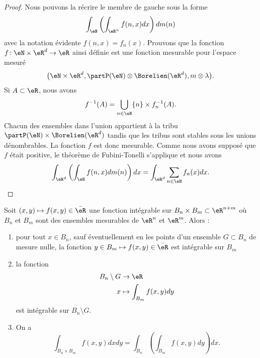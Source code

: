 \begin{proof}
	Nous pouvons la récrire le membre de gauche sous la forme
	\begin{equation}
		\int_{\eN}\left( \int_{\eR^n}f(n,x)dx \right)dm(n)
	\end{equation}
	avec la notation évidente \( f(n,x)=f_n(x)\). Prouvons que la fonction \( f\colon \eN\times\eR^d\to \eR\) ainsi définie est une fonction mesurable pour l'espace mesuré
	\begin{equation}
		\big( \eN\times\eR^d,\partP(\eN)\otimes\Borelien(\eR^d),m\otimes\lambda \big).
	\end{equation}
	Si \( A\subset\eR\), nous avons
	\begin{equation}
		f^{-1}(A)=\bigcup_{n\in\eN}\{ n \}\times f_n^{-1}(A).
	\end{equation}
	Chacun des ensembles dans l'union appartient à la tribu \( \partP(\eN)\times\Borelien(\eR^d)\) tandis que les tribus sont stables sous les unions dénombrables. La fonction \( f\) est donc mesurable. Comme nous avons supposé que \( f\) était positive, le théorème de Fubini-Tonelli s'applique et nous avons
	\begin{equation}
		\int_{\eR^d}\left( \int_{\eN}f(n,x)dm(n) \right)dx=\int_{\eR^d}\sum_{n\in \eN}f_n(x)dx.
	\end{equation}
\end{proof}

\begin{theorem}[Fubini]\label{ThoFubini}
	Soit \( (x,y)\mapsto f(x,y)\in\bar \eR\) une fonction intégrable sur \( B_n\times B_m\subset\eR^{n+m}\) où \( B_n\) et \( B_m\) sont des ensembles mesurables de \( \eR^n\) et \( \eR^m\). Alors :
	\begin{enumerate}
		\item pour tout \( x\in B_n\), sauf éventuellement en les points d'un ensemble \( G\subset B_n\) de mesure nulle, la fonction \( y\in B_m\mapsto f(x,y)\in\bar\eR\) est intégrable sur \( B_m\)
		\item
		      la fonction
		      \begin{equation}
			      \begin{aligned}
				      B_n\setminus G & \to \eR                    \\
				      x              & \mapsto \int_{B_m}f(x,y)dy
			      \end{aligned}
		      \end{equation}
		      est intégrable sur \( B_n\setminus G\).
		\item
		      On a
		      \begin{equation}
			      \int_{B_n\times B_m}f(x,y)dxdy=\int_{B_n}\left( \int_{B_m}f(x,y)dy \right)dx.
		      \end{equation}

	\end{enumerate}
\end{theorem}

